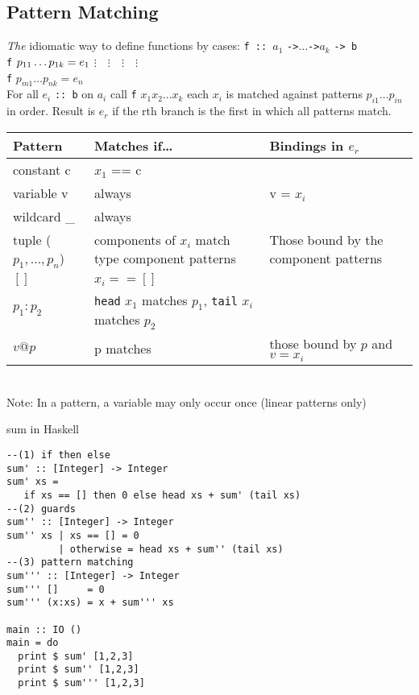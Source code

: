 \documentclass{article}
\newcommand{\Haskell}[1]{\texttt{#1}}
\begin{document}
\subsection{Pattern Matching}
\emph{The} idiomatic way to define functions by cases:
\Haskell{f :: }$a_1$ \Haskell{->}$\ldots$\Haskell{->}$a_k$ \Haskell{-> b}\\
\Haskell{f} $p_{11} \ldots p_{1k} = e_1\\$
$\vdots\quad \vdots\quad \vdots\quad \vdots $\\
\Haskell{f} $p_{m1} \ldots p_{nk} = e_n$\\
For all $e_i$ \Haskell{:: b}
on $a_i$ call \Haskell{f} $x_1x_2\ldots x_k$ each $x_i$ is matched against patterns $p_{i1}\ldots p_{in}$ in order. Result is $e_r$ if the rth branch is the first in which all patterns match.\\
\begin{tabular}{lp{4cm}p{4cm}}
Pattern&Matches if\ldots&Bindings in $e_r$\\\hline
constant c&$x_1$ == c\\
variable v&always& v = $x_i$\\
wildcard \_ &always\\
tuple ($p_1,\ldots,p_n$)&components of $x_i$ match type component patterns& Those bound by the component patterns\\
$[]$& $x_i == []$\\
$p_1:p_2$&\Haskell{head} $x_1$ matches $p_1$, \Haskell{tail} $x_i$ matches $p_2$\\
$v@p$& p matches&those bound by $p$ and $v=x_i$
\end{tabular}\\
Note: In a pattern, a variable may only occur once (linear patterns only)
\begin{listing}
\caption{sum in Haskell}
\begin{verbatim}
--(1) if then else
sum' :: [Integer] -> Integer
sum' xs =
   if xs == [] then 0 else head xs + sum' (tail xs)
--(2) guards
sum'' :: [Integer] -> Integer
sum'' xs | xs == [] = 0
         | otherwise = head xs + sum'' (tail xs)
--(3) pattern matching
sum''' :: [Integer] -> Integer
sum''' []     = 0
sum''' (x:xs) = x + sum''' xs

main :: IO ()
main = do
  print $ sum' [1,2,3]
  print $ sum'' [1,2,3]
  print $ sum''' [1,2,3]
\end{verbatim}
\end{listing}
\end{document}
